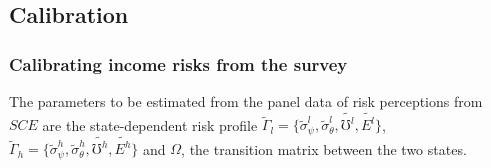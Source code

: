 \begin{comment}

\begin{center}
[FIGURE \ref{fig:comparison1} HERE]
\end{center}

Figure \ref{fig:comparison2} further compares the objective model under transitory unemployment risks versus the subjective model in which employment status leads to additional extrapolations in risk perceptions. Specifically, the latter model lets an unemployed worker be with the high-risk perceptions while the employed to be with the low-risk perceptions. This essentially makes the transition matrix $\Omega$ exactly equal to $\Pi$. I also configure risk parameters specific to each state such that on average it preserves the same size of permanent and transitory risks compared to the objective model. This guarantees the difference between the two model is not induced by change in the average degree of precautionary saving motives. 

\begin{center}
[FIGURE \ref{fig:comparison2} HERE]
\end{center}

The most obvious pattern seen in the figure is that within the objective model, unemployed workers have less consumption than employed workers. In addition, between the objective and subjective-extrapolation model, an employed worker with lower risk perceptions actually consume less than the employed worker in the objective model. 
\end{comment}

\subsection{Calibration}


\subsubsection{Calibrating income risks from the survey}
\label{subsubsec:survey_risk}
The parameters to be estimated from the panel data of risk perceptions from $SCE$ are the state-dependent risk profile $\tilde \Gamma_l=\{\tilde \sigma^l_\psi,\tilde \sigma^l_\theta, \tilde{\mho^l}, \tilde{E^l}\}$, $\tilde \Gamma_h =\{\tilde \sigma^h_\psi,\tilde \sigma^h_\theta, \tilde{\mho^h}, \tilde{E^h}\}$ and $\Omega$, the transition matrix between the two states.

